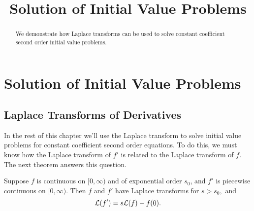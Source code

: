 \documentclass{ximera}
\title{Solution of Initial Value Problems}%
\begin{document}
\begin{abstract}
We demonstrate how Laplace transforms can be used to solve constant coefficient second order initial value problems.
\end{abstract}

\maketitle

\section*{Solution of Initial Value Problems}

\subsection*{Laplace Transforms of Derivatives}

In the rest of this chapter we'll use the Laplace transform to solve
initial value problems for constant coefficient second order
equations. To do this, we must know how the Laplace transform of
 $f'$ is related to the Laplace transform of $f$. The
next theorem answers this question.

\begin{theorem}\label{thmtype:8.3.1}
 Suppose $f$ is continuous
on $[0,\infty)$ and of exponential order $s_0$, and $f'$ is piecewise
continuous on $[0,\infty).$  Then $f$ and $f'$ have Laplace transforms for
$s > s_0,$ and
\begin{equation}\label{eq:8.3.1}
{\cal L}(f')=s {\cal L}(f)-f(0).
\end{equation}
\end{theorem}
\end{document}
